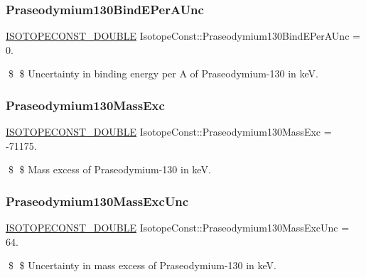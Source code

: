 \subsubsection{\texorpdfstring{Praseodymium130\+Bind\+E\+Per\+A\+Unc}{Praseodymium130BindEPerAUnc}}
{\footnotesize\ttfamily \mbox{\hyperlink{group___isotope_const-_macros_ga8f45a7272ce02c0b4c65c44636ed719a}{I\+S\+O\+T\+O\+P\+E\+C\+O\+N\+S\+T\+\_\+\+D\+O\+U\+B\+LE}} Isotope\+Const\+::\+Praseodymium130\+Bind\+E\+Per\+A\+Unc = 0.}

\$ \$ Uncertainty in binding energy per A of Praseodymium-\/130 in keV. \mbox{\label{group___isotope_const-_praseodymium-_pr130_gaadfa31ec49587660cf81bad0fb9e7371}} 
\subsubsection{\texorpdfstring{Praseodymium130\+Mass\+Exc}{Praseodymium130MassExc}}
{\footnotesize\ttfamily \mbox{\hyperlink{group___isotope_const-_macros_ga8f45a7272ce02c0b4c65c44636ed719a}{I\+S\+O\+T\+O\+P\+E\+C\+O\+N\+S\+T\+\_\+\+D\+O\+U\+B\+LE}} Isotope\+Const\+::\+Praseodymium130\+Mass\+Exc = -\/71175.}

\$ \$ Mass excess of Praseodymium-\/130 in keV. \mbox{\label{group___isotope_const-_praseodymium-_pr130_gad1ed256f10cff8b12eebc7b4ffaca3f9}} 
\subsubsection{\texorpdfstring{Praseodymium130\+Mass\+Exc\+Unc}{Praseodymium130MassExcUnc}}
{\footnotesize\ttfamily \mbox{\hyperlink{group___isotope_const-_macros_ga8f45a7272ce02c0b4c65c44636ed719a}{I\+S\+O\+T\+O\+P\+E\+C\+O\+N\+S\+T\+\_\+\+D\+O\+U\+B\+LE}} Isotope\+Const\+::\+Praseodymium130\+Mass\+Exc\+Unc = 64.}

\$ \$ Uncertainty in mass excess of Praseodymium-\/130 in keV. \mbox{\label{group___isotope_const-_praseodymium-_pr130_ga39f9ce239b65d1edc198b3020ad9640b}} 
